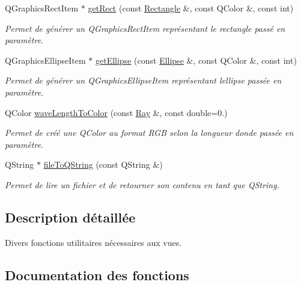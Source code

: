 \begin{DoxyCompactItemize}
Q\+Graphics\+Rect\+Item $\ast$ \hyperlink{namespaceviewUtilities_a90715ebf7ce7fc9fec5e4662479c8001}{get\+Rect} (const \hyperlink{classRectangle}{Rectangle} \&, const Q\+Color \&, const int)
\begin{DoxyCompactList}\small\item\em Permet de générer un Q\+Graphics\+Rect\+Item représentant le rectangle passé en paramètre. \end{DoxyCompactList}\item 
Q\+Graphics\+Ellipse\+Item $\ast$ \hyperlink{namespaceviewUtilities_aaac380653defdfe5d8dbe14c2d0b4158}{get\+Ellipse} (const \hyperlink{classEllipse}{Ellipse} \&, const Q\+Color \&, const int)
\begin{DoxyCompactList}\small\item\em Permet de générer un Q\+Graphics\+Ellipse\+Item représentant l\textquotesingle{}ellipse passée en paramètre. \end{DoxyCompactList}\item 
Q\+Color \hyperlink{namespaceviewUtilities_a47e2968ae7a9890971943ccd925348b1}{wave\+Length\+To\+Color} (const \hyperlink{classRay}{Ray} \&, const double=0.)
\begin{DoxyCompactList}\small\item\em Permet de créé une Q\+Color au format R\+G\+B selon la longueur d\textquotesingle{}onde passée en paramètre. \end{DoxyCompactList}\item 
Q\+String $\ast$ \hyperlink{namespaceviewUtilities_a77016e1644b342340afa333441d3e061}{file\+To\+Q\+String} (const Q\+String \&)
\begin{DoxyCompactList}\small\item\em Permet de lire un fichier et de retourner son contenu en tant que Q\+String. \end{DoxyCompactList}\end{DoxyCompactItemize}


\subsection{Description détaillée}
Divers fonctions utilitaires nécessaires aux vues. 

\subsection{Documentation des fonctions}
\hypertarget{namespaceviewUtilities_a77016e1644b342340afa333441d3e061}{}
